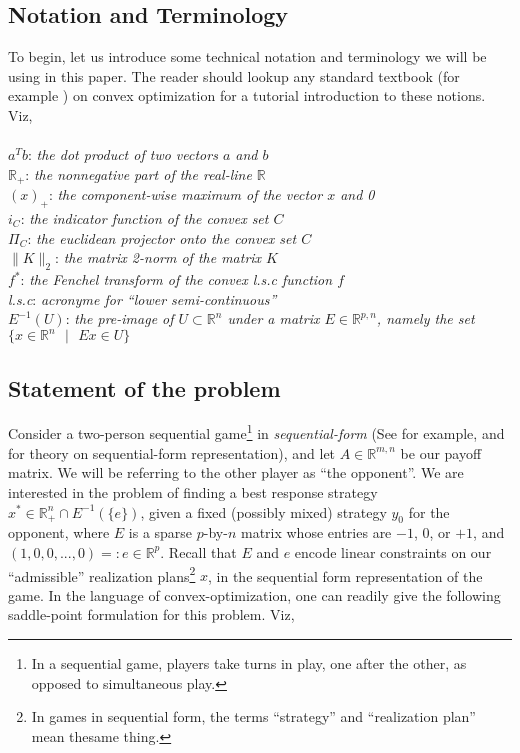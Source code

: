 \documentclass[a4paper,10pt,journal]{IEEEtran}
\begin{document}
\subsection{Notation and Terminology}
To begin, let us introduce some technical notation and terminology we will be using in this paper. The reader should lookup any standard textbook
(for example \cite{boyd2004}) on convex optimization for a tutorial introduction to these notions. Viz,\\\\
$a^Tb$: \quad \textit{the dot product of two vectors $a$ and $b$}\\
$\mathbb{R}_+$: \quad \textit{the nonnegative part of the real-line $\mathbb{R}$}\\
$(x)_+$: \quad \textit{the component-wise maximum of the vector $x$ and 0}\\
$i_C$: \quad \textit{the indicator function of the convex set $C$}\\
$\Pi_C$: \quad \textit{the euclidean projector onto the convex set $C$}\\
$\|K\|_2$: \quad \textit{the matrix 2-norm of the matrix $K$}\\
$f^*$: \quad \textit{the Fenchel transform of the convex l.s.c function $f$}\\
\textit{l.s.c}: \quad \textit{acronyme for ``lower semi-continuous''}\\
$E^{-1}(U)$: \quad \textit{the pre-image of $U \subset \mathbb{R}^n$ under a matrix $E \in \mathbb{R}^{p,n}$,
namely the set $\{x \in \mathbb{R}^n\text{ }| \text{ }Ex \in U\}$}

\subsection{Statement of the problem}
Consider a two-person sequential game\footnote{In a sequential game, players take turns in play, one after the other,
as opposed to simultaneous play.} in \textit{sequential-form} (See for example, \cite{von1996efficient} and \cite{koller1996efficient} 
for theory on sequential-form representation), and let $A \in \mathbb{R}^{m,n}$ be our payoff matrix.
We will be referring to the other player as ``the opponent''. We are interested in the problem of
finding a best response strategy $x^* \in \mathbb{R}_{+}^n \cap E^{-1}(\{e\})$, given a fixed
(possibly mixed) strategy $y_0$ for the opponent, where $E$ is a sparse $p$-by-$n$ matrix whose entries are $-1$, $0$, or $+1$,
and $(1, 0, 0, ..., 0) =: e \in \mathbb{R}^p$. Recall that $E$ and $e$ encode linear constraints on our ``admissible''
realization plans\footnote{In games in sequential form, the terms ``strategy'' and ``realization plan''
mean thesame thing.} $x$, in the sequential form representation of the game.
In the language of convex-optimization,
one can readily give the following saddle-point formulation for this problem. Viz,
\end{document}
